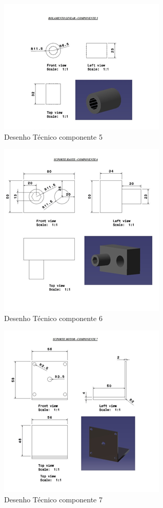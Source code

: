 \begin{apendicesenv}
\begin{figure}[H]
    \centering
      \includegraphics[scale=1.0]{figuras/tec5.png}
    \caption{Desenho Técnico componente 5}
    \label{tec5}
\end{figure}

\begin{figure}[H]
    \centering
      \includegraphics[scale=1.0]{figuras/tec6.png}
    \caption{Desenho Técnico componente 6}
    \label{tec6}
\end{figure}

\begin{figure}[H]
    \centering
      \includegraphics[scale=1.0]{figuras/tec7.png}
    \caption{Desenho Técnico componente 7}
    \label{tec7}
\end{figure}


\end{apendicesenv}
